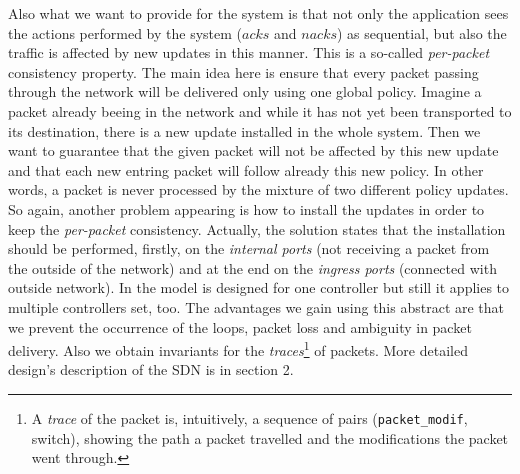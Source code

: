 \documentclass{article}
\theoremstyle{remark}
\begin{document}
Also what we want to provide for the system is that not only the application sees the actions performed by the system ($acks$ and $nacks$) as sequential, but also the traffic is affected by new updates in this manner. This is a so-called \emph{per-packet} consistency property\cite{Reitblatt:2012:ANU:2342356.2342427}. The main idea here is ensure that every packet passing through the network will be delivered only using one global policy. Imagine a packet already beeing in the network and while it has not yet been transported to its destination, there is a new update installed in the whole system. Then we want to guarantee that the given packet will not be affected by this new update and that each new entring packet will follow already this new policy. In other words, a packet is never processed by the mixture of two different policy updates.  
So again, another problem appearing is how to install the updates in order to keep the \emph{per-packet} consistency.
 Actually, the solution states that the installation should be performed, firstly, on the \emph{internal ports} (not receiving a packet from the outside of the network) and at the end on the \emph{ingress ports} (connected with outside network). In \cite{Reitblatt:2012:ANU:2342356.2342427} the model is designed for one controller but still it applies to multiple controllers set, too.
The advantages we gain using this abstract are that  we prevent the occurrence of the loops, packet loss and ambiguity in packet delivery. 
Also we obtain invariants for the \emph{traces}\footnote{A \emph{trace} of the packet is, intuitively, a sequence of pairs (\texttt{packet\_modif}, switch), showing the path a packet travelled and the modifications the packet went through.} of packets.
More detailed design's description of the SDN is in section 2. 

  
\end{document}
